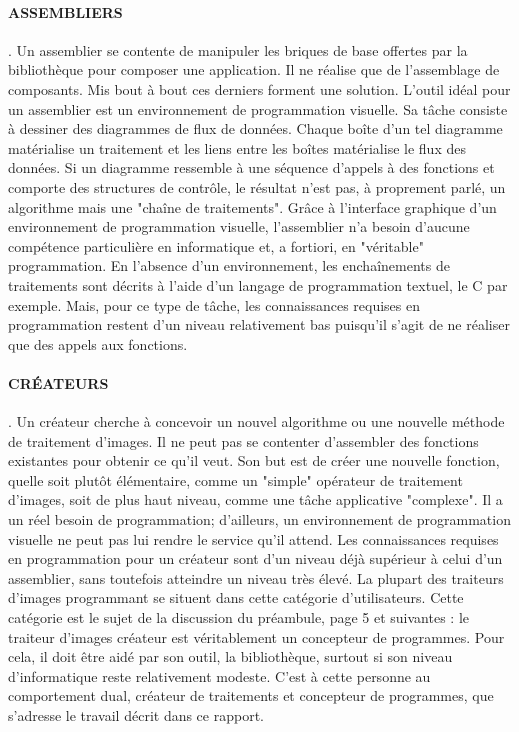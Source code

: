 \paragraph{ASSEMBLIERS}. Un assemblier se contente de manipuler les briques de base offertes par la
bibliothèque pour composer une application. Il ne réalise que de l'assemblage de composants. Mis
bout à bout ces derniers forment une solution. L'outil idéal pour un assemblier est un environnement
de programmation visuelle. Sa tâche consiste à dessiner des diagrammes de flux de données.
Chaque boîte d'un tel diagramme matérialise un traitement et les liens entre les boîtes matérialise
le flux des données. Si un diagramme ressemble à une séquence d'appels à des fonctions et
comporte des structures de contrôle, le résultat n'est pas, à proprement parlé, un algorithme mais
une "chaîne de traitements". Grâce à l'interface graphique d'un environnement de programmation
visuelle, l'assemblier n'a besoin d'aucune compétence particulière en informatique et, a fortiori, en
"véritable" programmation. En l'absence d'un environnement, les enchaînements de traitements
sont décrits à l'aide d'un langage de programmation textuel, le C par exemple. Mais, pour ce type de
tâche, les connaissances requises en programmation restent d'un niveau relativement bas puisqu'il
s'agit de ne réaliser que des appels aux fonctions.
\paragraph{CRÉATEURS} . Un créateur cherche à concevoir un nouvel algorithme ou une nouvelle méthode
de traitement d'images. Il ne peut pas se contenter d'assembler des fonctions existantes pour obtenir
ce qu'il veut. Son but est de créer une nouvelle fonction, quelle soit plutôt élémentaire, comme un
"simple" opérateur de traitement d'images, soit de plus haut niveau, comme une tâche applicative
"complexe". Il a un réel besoin de programmation; d'ailleurs, un environnement de programmation
visuelle ne peut pas lui rendre le service qu'il attend. Les connaissances requises en programmation
pour un créateur sont d'un niveau déjà supérieur à celui d'un assemblier, sans toutefois atteindre un
niveau très élevé. La plupart des traiteurs d'images programmant se situent dans cette catégorie
d'utilisateurs. Cette catégorie est le sujet de la discussion du préambule, page 5 et suivantes : le
traiteur d'images créateur est véritablement un concepteur de programmes. Pour cela, il doit être
aidé par son outil, la bibliothèque, surtout si son niveau d'informatique reste relativement modeste.
C'est à cette personne au comportement dual, créateur de traitements et concepteur de programmes,
que s'adresse le travail décrit dans ce rapport.
